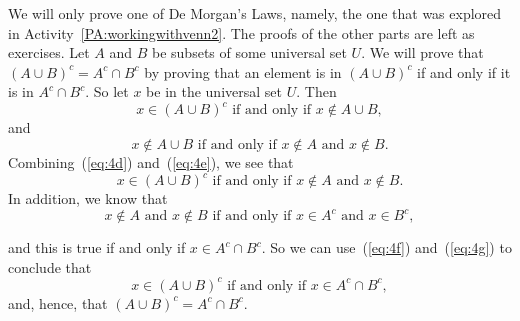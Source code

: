 \setcounter{equation}{0}
\noindent
\begin{myproof} 
We will only prove one of De Morgan's Laws, namely, the one that was explored in 
\typeu Activity~\ref*{PA:workingwithvenn2}.  The proofs of the other parts are left as exercises.  Let  $A$  and  $B$  be subsets of some universal set  $U$.  We will prove that  
$\left( {A \cup B} \right)^c  = A^c  \cap B^c $ by proving that an element is in  $\left( {A \cup B} \right)^c$
 if and only if it is in  $A^c  \cap B^c $.  So let  $x$  be in the universal set  $U$.  Then
%
\begin{equation} \label{eq:4d}
x \in \left( {A \cup B} \right)^c \text{  if and only if  } x \notin A \cup B,
\end{equation}
%
and
%
\begin{equation} \label{eq:4e}
x \notin A \cup B\text{  if and only if  }x \notin A\text{  and  }x \notin B.
\end{equation}
%
Combining~(\ref{eq:4d}) and~(\ref{eq:4e}), we see that
%
\begin{equation} \label{eq:4f}
x \in \left( {A \cup B} \right)^c \text{  if and only if  }x \notin A\text{  and  }x \notin B.
\end{equation}
%
In addition, we know that
%
\begin{equation} \label{eq:4g}
x \notin A \text{  and  } x \notin B \text{  if and only if  } x \in A^c \text{  and  } x \in B^c, 
\end{equation}

\noindent
and this is true if and only if  $x \in A^c  \cap B^c $.  So we can use~(\ref{eq:4f}) and~(\ref{eq:4g}) to conclude that
%
\[
x \in \left( {A \cup B} \right)^c \text{  if and only if  }x \in A^c  \cap B^c, 
\]
%
and, hence, that  $\left( {A \cup B} \right)^c  = A^c  \cap B^c $.
\end{myproof}
\hbreak

